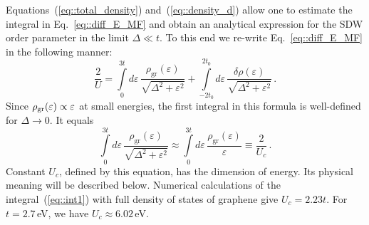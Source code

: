 \documentclass[prb,twocolumn,showpacs,aps,superscriptaddress,floatfix]{revtex4}
\begin{document}
Equations~(\ref{eq::total_density})
and~(\ref{eq::density_d})
allow one to estimate the integral in
Eq.~\eqref{eq::diff_E_MF}
and obtain an analytical expression for the SDW order parameter in the
limit
$\Delta\ll t$.
To this end we re-write
Eq.~\eqref{eq::diff_E_MF}
in the following manner:
\begin{equation}
\label{eq::diff_E_MF1}
\frac{2}{U}=\int\limits_{0}^{3t}\!\!d\varepsilon\,
	\frac{\rho_{\text{gr}}(\varepsilon)}{\sqrt{\Delta^2+\varepsilon^2}}
+\!\!\!
\int\limits_{-2t_0}^{2t_0}\!\!\!d\varepsilon\,
	\frac{\delta\rho(\varepsilon)}{\sqrt{\Delta^2+\varepsilon^2}}\,.
\end{equation}
Since
$\rho_{\rm gr}(\varepsilon)\propto\varepsilon$
at small energies, the first integral in this formula is well-defined for
$\Delta\to0$.
It equals
\begin{equation}
\label{eq::int1}
\int\limits_{0}^{3t}\!\!d\varepsilon\,\frac{\rho_{\text{gr}}(\varepsilon)}{\sqrt{\Delta^2+\varepsilon^2}}
\approx\!\int\limits_{0}^{3t}\!\!d\varepsilon\,\frac{\rho_{\text{gr}}(\varepsilon)}{\varepsilon}\equiv\frac{2}{U_c}\,.
\end{equation}
Constant
$U_c$,
defined by this equation, has the dimension of energy. Its physical meaning
will be described below. Numerical calculations of the
integral~(\ref{eq::int1})
with full density of states of graphene give
$U_c=2.23t$.
For
$t=2.7$\,eV, we have
$U_c\approx6.02$\,eV.
\end{document}
